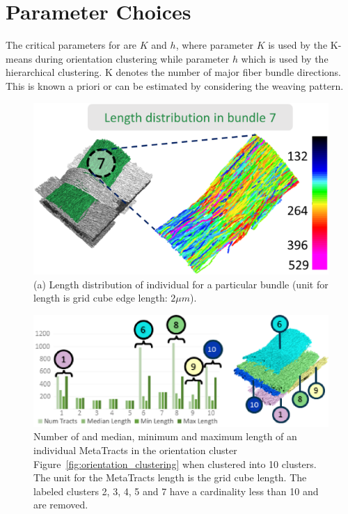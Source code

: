 \section{Parameter Choices}\label{sec:param_choices}
The critical parameters for \mt are $K$ and $h$, where parameter $K$ is used by the K-means during orientation clustering while parameter $h$ which is used by the hierarchical clustering.
K denotes the number of major fiber bundle directions. This is known a priori or can be estimated by considering the weaving pattern. 
\begin{figure}[tb]
	\centering
	\includegraphics[width=0.8\linewidth]{images/lengthDistribution.eps}
	\caption{(a) Length distribution of individual \mt for a particular bundle (unit for length is grid cube edge length:  $2\mu m$).}
	\label{fig:length_distribution}
\end{figure}
\begin{figure}[tb]
	\centering
	\includegraphics[width=\linewidth,  trim = 0mm 0mm 0mm 00mm, clip]{images/figure9_AMA.eps}
	\caption{Number of \mt and median, minimum and maximum length of an individual MetaTracts in the orientation cluster Figure~\ref{fig:orientation_clustering} when clustered into 10 clusters. The unit for the MetaTracts length is the grid cube length. The labeled clusters 2, 3, 4, 5 and 7 have a cardinality less than 10 and are removed. }
	\label{fig:len_dist_crop16} 
\end{figure}
